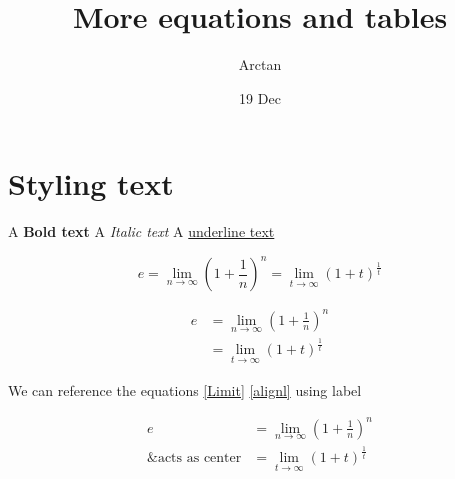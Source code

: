 \documentclass{article}
\title{More equations and tables}
\author{Arctan}
\date{19 Dec}
\begin{document}
\maketitle

\section{Styling text}

A \textbf{Bold text}
A \textit{Italic text}
A \underline{underline text}

    \begin{equation}
    \label{Limit}
        e = \lim_{n\to\infty}\left(1+\frac{1}{n}\right)^n
          = \lim_{t\to\infty}(1+t)^\frac{1}{t}
    \end{equation}

    \begin{align}
    \label{alignl}
        e& = \lim_{n\to\infty}\left(1+\frac{1}{n}\right)^n \\ 
          &= \lim_{t\to\infty}(1+t)^\frac{1}{t}
    \end{align}

    We can reference the equations \ref{Limit} \ref{alignl} using label 

    \begin{equation}
    \begin{split}
        e &= \lim_{n\to\infty}\left(1+\frac{1}{n}\right)^n \\
        \text{\& acts as center}  &= \lim_{t\to\infty}(1+t)^\frac{1}{t}
    \end{split} 
    \end{equation}
\end{document}
